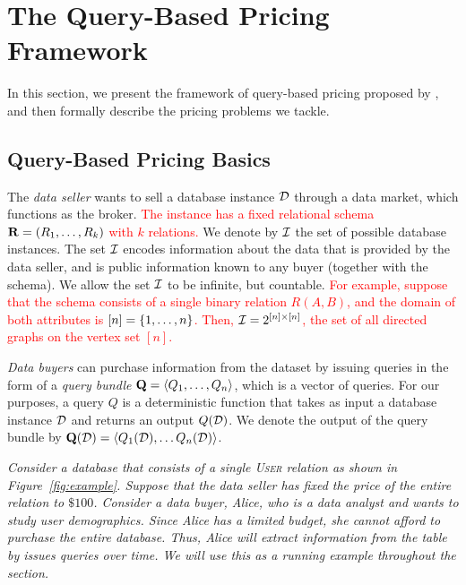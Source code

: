 \section{The Query-Based Pricing Framework}
\label{sec:framework}

In this section, we present the framework of query-based pricing proposed by \cite{deep2016design} , and then formally describe the pricing problems we tackle.

\subsection{Query-Based Pricing Basics}

The {\em data seller} wants to sell a database instance $\mathcal{D}$ through a data market, which functions as the broker. \textcolor{red}{The instance has a fixed relational schema $\mathbf{R} = (R_1, \dots, R_k)$ with $k$ relations.} We denote by $\mathcal{I}$ the set of possible database instances. The set $\mathcal{I}$ encodes information about the data that is provided by the data seller, and is public information known to any buyer (together with the schema). We allow the set $\mathcal{I}$ to be infinite, but countable. \textcolor{red}{For example, suppose that the schema consists of a single binary relation $R(A,B)$, and the domain of both attributes is $[n] = \{1, \dots, n\}$. Then, $\mathcal{I} = 2^{[n] \times [n]}$, \ie the set of all directed graphs on the vertex set $[n]$.}

{\em Data buyers} can purchase information from the dataset by issuing queries in the form of a {\em query bundle}  $\mathbf{Q}=\langle {Q_1, \hdots, Q_n} \rangle$, which is a vector of queries. For our purposes, a query $Q$ is a deterministic function that takes as input a database instance $\mathcal{D}$ and returns an output $Q(\mathcal{D})$. We denote the output of the query bundle by $\mathbf{Q}(\mathcal{D}) = \langle {Q_1(\mathcal{D}), \hdots Q_n(\mathcal{D})} \rangle$. 

\begin{example}
	\textit{Consider a database that consists of a single \textsc{User} relation as shown in Figure~\ref{fig:example}. Suppose that the data seller has fixed the price of the entire relation to $\$100$. Consider a data buyer, Alice, who is a data analyst and wants to study user demographics. Since Alice has a limited budget, she cannot afford to purchase the entire database. Thus, Alice will extract information from the table by issues queries over time. We will use this as a running example throughout the section.}
\end{example}

